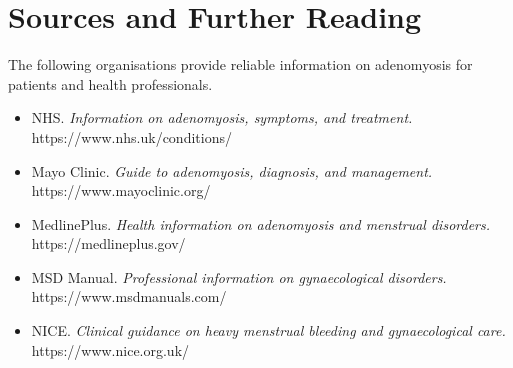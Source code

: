 \section*{Sources and Further Reading}
The following organisations provide reliable information on adenomyosis for patients and health professionals.

\begin{itemize}
    \item NHS. \textit{Information on adenomyosis, symptoms, and treatment.} https://www.nhs.uk/conditions/
    \item Mayo Clinic. \textit{Guide to adenomyosis, diagnosis, and management.} https://www.mayoclinic.org/
    \item MedlinePlus. \textit{Health information on adenomyosis and menstrual disorders.} https://medlineplus.gov/
    \item MSD Manual. \textit{Professional information on gynaecological disorders.} https://www.msdmanuals.com/
    \item NICE. \textit{Clinical guidance on heavy menstrual bleeding and gynaecological care.} https://www.nice.org.uk/
\end{itemize}
